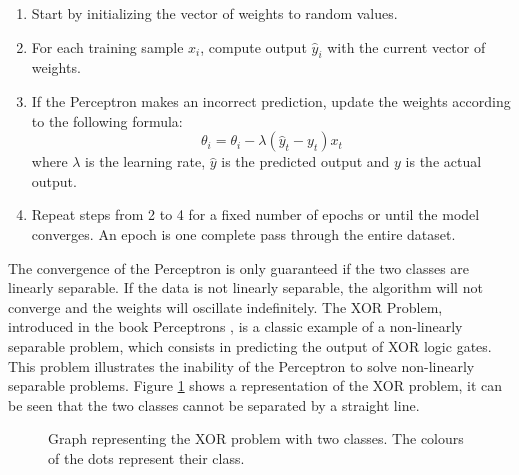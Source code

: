 \documentclass[11pt,english,listoffigures,listoftables]{tfgetsinf}
\begin{document}
\begin{enumerate}
    \item Start by initializing the vector of weights to random values.
    \item For each training sample \( x_i \), compute output \( \hat{y}_i \) with the current vector of weights.
    \item If the Perceptron makes an incorrect prediction, update the weights according to the following formula:
    \begin{equation}
        \theta_{i} = \theta_i - \lambda(\hat{y}_t-y_t)x_t
    \end{equation}
    where \( \lambda \) is the learning rate, \( \hat{y} \) is the predicted output and \( y \) is the actual output.
    \item Repeat steps from 2 to 4 for a fixed number of epochs or until the model converges. An epoch is one complete pass through the entire dataset.

\end{enumerate}

The convergence of the Perceptron is only guaranteed if the two classes are linearly separable. If the data is not linearly separable, the algorithm will not converge and the weights will oscillate indefinitely. The XOR Problem, introduced in the book Perceptrons \cite{rosenblatt1958perceptron}, is a classic example of a non-linearly separable problem, which consists in predicting the output of XOR logic gates. This problem illustrates the inability of the Perceptron to solve non-linearly separable problems. Figure \ref{fig:xor} shows a representation of the XOR problem, it can be seen that the two classes cannot be separated by a straight line.


\begin{figure}[h]
\centering
{}
\caption{Graph representing the XOR problem with two classes. The colours of the dots represent their class.}
\label{fig:xor}
\end{figure}
\end{document}
